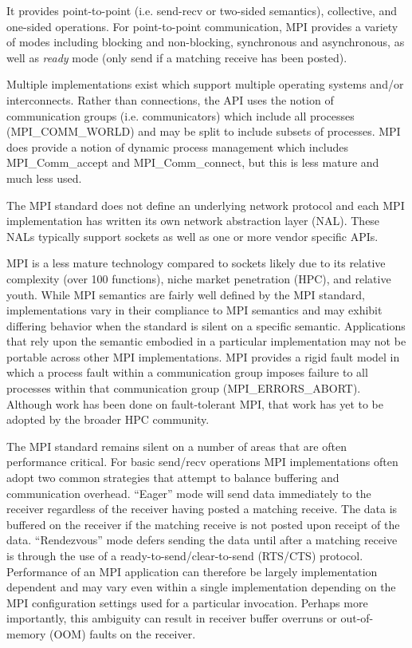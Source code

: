 It provides point-to-point (i.e. send-recv or two-sided semantics), collective, and
one-sided operations. For point-to-point communication, MPI provides a variety of modes
including blocking and non-blocking, synchronous and asynchronous, as well as \emph{ready}
mode (only send if a matching receive has been posted).

Multiple implementations exist\cite{ompi_04_pvmmpi_overview, Gropp:1996:HPI, Liu:2003:RDMA, intel-mpi, platform-mpi}
which support multiple operating systems and/or interconnects.  Rather than connections,
the API uses the notion of communication groups (i.e.  communicators) which include all
processes (MPI\_COMM\_WORLD) and may be split to include subsets of processes. MPI does
provide a notion of dynamic process management which includes MPI\_Comm\_accept and
MPI\_Comm\_connect, but this is less mature and much less used.

The MPI standard does not define an underlying network protocol and each MPI
implementation has written its own network abstraction layer (NAL). These NALs typically
support sockets as well as one or more vendor specific APIs.

MPI is a less mature technology compared to sockets likely due to its
relative complexity (over 100 functions), niche market penetration
(HPC), and relative youth. While MPI semantics are fairly well defined
by the MPI standard, implementations vary in their compliance to MPI
semantics and may exhibit differing behavior when the standard is
silent on a specific semantic. Applications that rely upon the
semantic embodied in a particular implementation may not be portable
across other MPI implementations. MPI provides a rigid fault model in
which a process fault within a communication group imposes failure to
all processes within that communication group
(MPI\_ERRORS\_ABORT). Although work has been done on fault-tolerant
MPI\cite{fagg04:_fault_toler_commun_librar_applic_high_perof, mpi-ft}, that work has yet to be adopted by the
broader HPC community. 

The MPI standard remains silent on a number of areas that are
often performance critical. For basic send/recv operations MPI
implementations often adopt two common strategies that attempt to
balance buffering and communication overhead. ``Eager'' mode will send
data immediately to the receiver regardless of the receiver having
posted a matching receive. The data is buffered on the receiver if the
matching receive is not posted upon receipt of the
data. ``Rendezvous'' mode defers sending the data until after a
matching receive is through the use of a ready-to-send/clear-to-send
(RTS/CTS) protocol. Performance of an MPI application can therefore be
largely implementation dependent and may vary even within a single
implementation depending on the MPI configuration settings used for a
particular invocation. Perhaps more importantly, this ambiguity can
result in receiver buffer overruns or out-of-memory (OOM) faults on
the receiver. 

